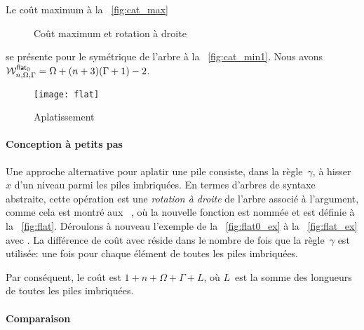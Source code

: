 Le coût maximum à la
\fig~\ref{fig:cat_max}
\begin{figure}
\centering
{}
\qquad
{}
\qquad
{}
\caption{Coût maximum et rotation à droite}
\end{figure}
se présente pour le symétrique de l'arbre à la
\fig~\ref{fig:cat_min1}. Nous
avons
\(\W{\fun{flat}_0}{n,\Omega,\Gamma} = \Omega + (n+3)(\Gamma+1) - 2\).

%
\begin{wrapfigure}[7]{r}[0pt]{0pt}
\centering
\texttt{[image: flat]}%
\caption{Aplatissement}
\label{fig:flat}
\end{wrapfigure}

\paragraph{Conception à petits pas}

Une approche alternative pour aplatir une pile consiste, dans la
règle~\(\gamma\), à hisser~\(x\) d'un niveau parmi les piles
imbriquées. En termes d'arbres de syntaxe abstraite, cette opération
est une \emph{rotation à droite} de
l'arbre associé à l'argument, comme cela est montré aux
\figs~, où la nouvelle fonction est
nommée  et est définie à la
\fig~\vref{fig:flat}. Déroulons à nouveau l'exemple de la
\fig~\vref{fig:flat0_ex} à la \fig~\vref{fig:flat_ex} avec
. La différence de coût avec
 réside dans le nombre
de fois que la règle~\(\gamma\) est utilisée: une fois pour chaque
élément de toutes les piles imbriquées.

Par conséquent, le coût
\label{cost_flat} est \(1 + n + \Omega
+ \Gamma + L\), où \(L\)~est la somme des longueurs de toutes les
piles imbriquées.

\paragraph{Comparaison}

